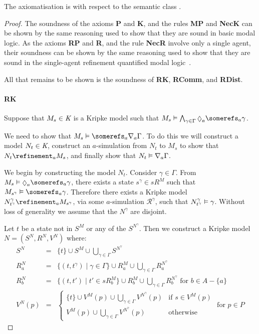 \begin{lemma}\label{k-sound}
The axiomatisation \axiomKF{} is with respect to the semantic class \classK{}.
\end{lemma}

\begin{proof}
The soundness of the axioms {\bf P} and {\bf K}, and the rules {\bf MP} and
{\bf NecK} can be shown by the same reasoning used to show that they are sound
in basic modal logic. As the axioms {\bf RP} and {\bf R}, and the rule {\bf
NecR} involve only a single agent, their soundness can be shown by the same
reasoning used to show that they are sound in the single-agent refinement
quantified modal logic~\cite{french2010future}.

All that remains to be shown is the soundness of {\bf RK}, {\bf RComm}, and {\bf
RDist}.

\paragraph{RK}
Suppose that $M_s \in \textit{K}$ is a Kripke model such that $M_s \entails
\bigwedge_{\gamma \in \Gamma} \suspects_a \somerefs_a \gamma$.

We need to show that $M_s \entails \somerefs_a \covers_a \Gamma$. To do this we
will construct a model $N_t \in \textit{K}$, construct an $a$-simulation from $N_t$
to $M_s$ to show that $N_t \refinement_a M_s$, and finally show that $N_t
\vDash \nabla_a \Gamma$.

We begin by constructing the model $N_t$. Consider $\gamma \in \Gamma$. From
$M_s \entails \suspects_a \somerefs_a \gamma$, there exists a state $s^\gamma
\in sR^M$ such that $M_{s^\gamma} \entails \somerefs_a \gamma$. Therefore there
exists a Kripke model $N^\gamma_{t^\gamma} \refinement_a M_{s^\gamma}$, via some
$a$-simulation $\mathcal{R}^\gamma$, such that $N^\gamma_{t^\gamma} \vDash
\gamma$. Without loss of generality we assume that the $N^\gamma$ are disjoint.

Let $t$ be a state not in $S^M$ or any of the $S^{N^\gamma}$. Then we construct a
Kripke model $N = (S^N, R^N, V^N)$ where:
\begin{eqnarray*}
S^N &=& \{t\} \cup S^M \cup \bigcup_{\gamma \in \Gamma} S^{N^\gamma}\\
R^N_a &=& \{(t, t^\gamma) \mid \gamma \in \Gamma\}
\cup R^M_a
\cup \bigcup_{\gamma \in \Gamma} R^{N^\gamma}_a\\
R^N_b &=& \{(t, t') \mid t' \in sR^M_b\}
\cup R^M_b
\cup \bigcup_{\gamma \in \Gamma} R^{N^\gamma}_b \text{ for $b \in A - \{a\}$}\\
V^N(p) &=& 
\begin{cases}
\displaystyle \{t\} \cup V^M(p) \cup \bigcup_{\gamma \in \Gamma} V^{N^\gamma}(p) & \text{if $s
\in V^M(p)$}\\
\displaystyle V^M(p) \cup \bigcup_{\gamma \in \Gamma} V^{N^\gamma}(p) & \text{otherwise}
\end{cases}
\text{ for $p \in P$}
\end{eqnarray*}


\end{proof}
